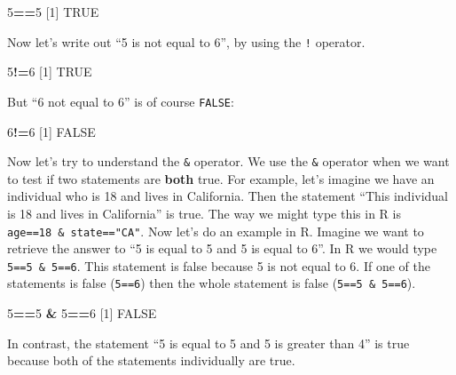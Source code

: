 \documentclass[
]{book}
\newenvironment{Shaded}{\begin{snugshade}}{\end{snugshade}}
\newcommand{\ConstantTok}[1]{\textcolor[rgb]{0.56,0.35,0.01}{#1}}
\newcommand{\DecValTok}[1]{\textcolor[rgb]{0.00,0.00,0.81}{#1}}
\newcommand{\NormalTok}[1]{#1}
\newcommand{\SpecialCharTok}[1]{\textcolor[rgb]{0.81,0.36,0.00}{\textbf{#1}}}
\begin{document}
\begin{Shaded}
\begin{Highlighting}[]
\DecValTok{5}\SpecialCharTok{==}\DecValTok{5}
\NormalTok{[}\DecValTok{1}\NormalTok{] }\ConstantTok{TRUE}
\end{Highlighting}
\end{Shaded}

Now let's write out ``5 is not equal to 6'', by using the \texttt{!} operator.

\begin{Shaded}
\begin{Highlighting}[]
\DecValTok{5}\SpecialCharTok{!=}\DecValTok{6}
\NormalTok{[}\DecValTok{1}\NormalTok{] }\ConstantTok{TRUE}
\end{Highlighting}
\end{Shaded}

But ``6 not equal to 6'' is of course \texttt{FALSE}:

\begin{Shaded}
\begin{Highlighting}[]
\DecValTok{6}\SpecialCharTok{!=}\DecValTok{6}
\NormalTok{[}\DecValTok{1}\NormalTok{] }\ConstantTok{FALSE}
\end{Highlighting}
\end{Shaded}

Now let's try to understand the \texttt{\&} operator. We use the \texttt{\&} operator when we want to test if two statements are \textbf{both} true. For example, let's imagine we have an individual who is 18 and lives in California. Then the statement ``This individual is 18 and lives in California'' is true. The way we might type this in R is \texttt{age==18\ \&\ state=="CA"}. Now let's do an example in R. Imagine we want to retrieve the answer to ``5 is equal to 5 and 5 is equal to 6''. In R we would type \texttt{5==5\ \&\ 5==6}. This statement is false because 5 is not equal to 6. If one of the statements is false (\texttt{5==6}) then the whole statement is false (\texttt{5==5\ \&\ 5==6}).

\begin{Shaded}
\begin{Highlighting}[]
\DecValTok{5}\SpecialCharTok{==}\DecValTok{5} \SpecialCharTok{\&} \DecValTok{5}\SpecialCharTok{==}\DecValTok{6}
\NormalTok{[}\DecValTok{1}\NormalTok{] }\ConstantTok{FALSE}
\end{Highlighting}
\end{Shaded}

In contrast, the statement ``5 is equal to 5 and 5 is greater than 4'' is true because both of the statements individually are true.
\end{document}
